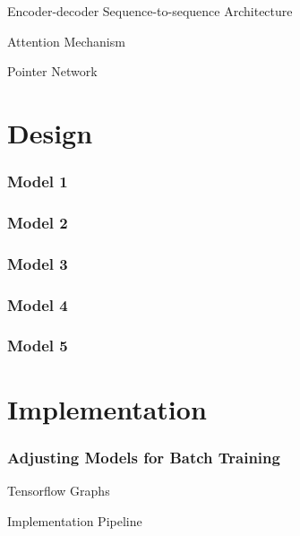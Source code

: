 \documentclass{beamer}
\begin{document}
\begin{frame}{Encoder-decoder Sequence-to-sequence Architecture}

\end{frame}

\begin{frame}{Attention Mechanism}

\end{frame}

\begin{frame}{Pointer Network}

\end{frame}

\section{Design}

\begin{frame} \frametitle{Model 1}

\end{frame}

\begin{frame} \frametitle{Model 2}

\end{frame}

\begin{frame} \frametitle{Model 3}

\end{frame}

\begin{frame} \frametitle{Model 4}

\end{frame}

\begin{frame} \frametitle{Model 5}

\end{frame}

\section{Implementation}

\begin{frame} \frametitle{Adjusting Models for Batch Training}

\end{frame}


\begin{frame}{Tensorflow Graphs}

\end{frame}

\begin{frame}{Implementation Pipeline}

\end{frame}
\end{document}
